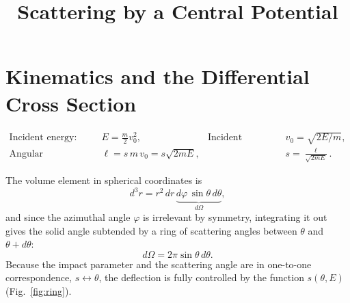 \documentclass[11pt]{article}
\title{Scattering by a Central Potential}
\author{}
\date{}
\newcommand{\Om}{\Omega}
\begin{document}
\maketitle
\vspace{-2.5em}

\section{Kinematics and the Differential Cross Section}

\begin{align}
\text{Incident energy:}\quad & E = \frac{m}{2}v_0^2, &
\text{Incident velocity:}\quad & v_0 = \sqrt{2E/m}, \\
\text{Angular momentum:}\quad & \ell = s\,m\,v_0 = s\sqrt{2mE}, &
& s = \frac{\ell}{\sqrt{2mE}}.
\end{align}

The volume element in spherical coordinates is
\begin{equation}
d^3r = r^2\,dr\,\underbrace{d\varphi\,\sin\theta\,d\theta}_{\displaystyle d\Om},
\end{equation}
and since the azimuthal angle $\varphi$ is irrelevant by symmetry, integrating
it out gives the solid angle subtended by a ring of scattering angles between
$\theta$ and $\theta+d\theta$:
\begin{equation}
d\Om = 2\pi\sin\theta\,d\theta.
\end{equation}
Because the impact parameter and the scattering angle are in one-to-one
correspondence, $s\leftrightarrow\theta$, the deflection is fully controlled by
the function $s(\theta,E)$ (Fig.~\ref{fig:ring}).
\end{document}
